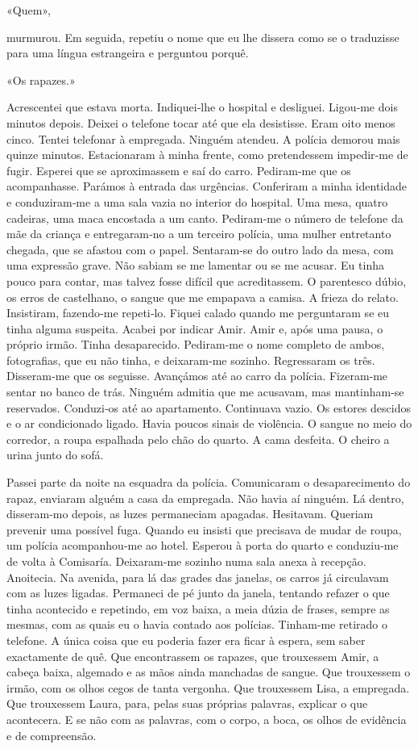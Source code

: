 «Quem»,

murmurou. Em seguida, repetiu o nome que eu lhe dissera como se o
traduzisse para uma língua estrangeira e perguntou porquê.

«Os rapazes.»

Acrescentei que estava morta. Indiquei­‑lhe o hospital e desliguei.
Ligou­‑me dois minutos depois. Deixei o telefone tocar até que ela
desistisse. Eram oito menos cinco. Tentei telefonar à empregada. Ninguém
atendeu. A polícia demorou mais quinze minutos. Estacionaram à minha
frente, como pretendessem impedir­‑me de fugir. Esperei que se
aproximassem e saí do carro. Pediram­‑me que os acompanhasse. Parámos à
entrada das urgências. Conferiram a minha identidade e conduziram­‑me a
uma sala vazia no interior do hospital. Uma mesa, quatro cadeiras, uma
maca encostada a um canto. Pediram­‑me o número de telefone da mãe da
criança e entregaram­‑no a um terceiro polícia, uma mulher entretanto
chegada, que se afastou com o papel. Sentaram­‑se do outro lado da mesa,
com uma expressão grave. Não sabiam se me lamentar ou se me acusar. Eu
tinha pouco para contar, mas talvez fosse difícil que acreditassem. O
parentesco dúbio, os erros de castelhano, o sangue que me empapava a
camisa. A frieza do relato. Insistiram, fazendo­‑me repeti­‑lo. Fiquei
calado quando me perguntaram se eu tinha alguma suspeita. Acabei por
indicar Amir. Amir e, após uma pausa, o próprio irmão. Tinha
desaparecido. Pediram­‑me o nome completo de ambos, fotografias, que eu
não tinha, e deixaram­‑me sozinho. Regressaram os três. Disseram­‑me que
os seguisse. Avançámos até ao carro da polícia. Fizeram­‑me sentar no
banco de trás. Ninguém admitia que me acusavam, mas mantinham­‑se
reservados. Conduzi­‑os até ao apartamento. Continuava vazio. Os estores
descidos e o ar condicionado ligado. Havia poucos sinais de violência. O
sangue no meio do corredor, a roupa espalhada pelo chão do quarto. A
cama desfeita. O cheiro a urina junto do sofá.

Passei parte da noite na esquadra da polícia. Comunicaram o
desaparecimento do rapaz, enviaram alguém a casa da empregada. Não havia
aí ninguém. Lá dentro, disseram­‑mo depois, as luzes permaneciam
apagadas. Hesitavam. Queriam prevenir uma possível fuga. Quando eu
insisti que precisava de mudar de roupa, um polícia acompanhou­‑me ao
hotel. Esperou à porta do quarto e conduziu­‑me de volta à Comisaría.
Deixaram­‑me sozinho numa sala anexa à recepção. Anoitecia. Na avenida,
para lá das grades das janelas, os carros já circulavam com as luzes
ligadas. Permaneci de pé junto da janela, tentando refazer o que tinha
acontecido e repetindo, em voz baixa, a meia dúzia de frases, sempre as
mesmas, com as quais eu o havia contado aos polícias. Tinham­‑me
retirado o telefone. A única coisa que eu poderia fazer era ficar à
espera, sem saber exactamente de quê. Que encontrassem os rapazes, que
trouxessem Amir, a cabeça baixa, algemado e as mãos ainda manchadas de
sangue. Que trouxessem o irmão, com os olhos cegos de tanta vergonha.
Que trouxessem Lisa, a empregada. Que trouxessem Laura, para, pelas suas
próprias palavras, explicar o que acontecera. E se não com as palavras,
com o corpo, a boca, os olhos de evidência e de compreensão.

